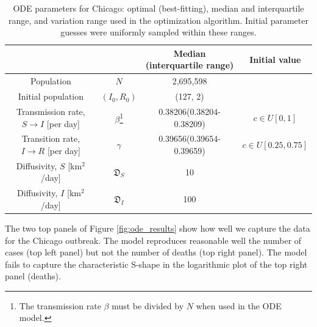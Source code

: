 \documentclass[11pt]{article}
\newcommand{\D}{\mathfrak{D}}
\begin{document}
\begin{savenotes}
\begin{table}[h]
	\centering
	\caption{ODE parameters for Chicago: optimal (best-fitting), median and interquartile range, and variation range used in the optimization algorithm. Initial parameter guesses were uniformly sampled within these ranges.}
	\label{tab:parameters}
	\begin{tabular}{ c c c c }
		\hline
		\hline
			&	&	Median (interquartile range)	&	Initial value \\
		\hline
		Population	&	$N$	&	2,695,598	& \\
		Initial population	&	$(I_0, R_0)$	&	(127, 2)	& \\
		Transmission rate, $S \rightarrow I$ [per day]	&	$\beta$\footnote{The transmission rate $\beta$ must be divided by $N$ when used in the ODE model.}	&	0.38206(0.38204-0.38209)	&	$c \in U[0,1]$ \\
		Transition rate, $I \rightarrow R$ [per day]	&	$\gamma$	&	 0.39656(0.39654-0.39659)	&	$c \in U[0.25,0.75]$ \\
		Diffusivity, $S$ [km$^2$/day]	&	$\D_S$	&	10	&	\\
		Diffusivity, $I$ [km$^2$/day]	&	$\D_I$	&	100	&	\\
		\hline
		\hline
	\end{tabular}
\end{table}
\end{savenotes}

The two top panels of Figure \ref{fig:ode_results} show how well we capture the data for the Chicago outbreak.
The model reproduces reasonable well the number of cases (top left panel) but not the number of deaths (top right panel).
The model fails to capture the characteristic S-shape in the logarithmic plot of the top right panel (deaths).
\end{document}
